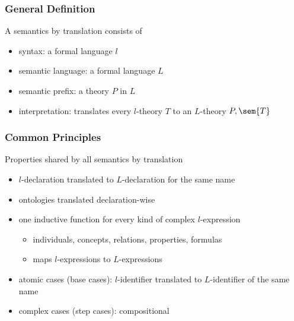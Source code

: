 \begin{frame}\frametitle{General Definition}
A semantics by translation consists of
\begin{itemize}
 \item syntax: a formal language $l$
 \item semantic language: a formal language $L$
 \item semantic prefix: a theory $P$ in $L$
 \item interpretation: translates every $l$-theory $T$ to an $L$-theory $P,\sem{T}$
\end{itemize}
\end{frame}

\begin{frame}\frametitle{Common Principles}
Properties shared by all semantics by translation
\begin{itemize}
 \item $l$-declaration translated to $L$-declaration for the same name
 \item ontologies translated declaration-wise
 \item one inductive function for every kind of complex $l$-expression
  \begin{itemize}
   \item individuals, concepts, relations, properties, formulas
   \item maps $l$-expressions to $L$-expressions
  \end{itemize}
 \item atomic cases (base cases): $l$-identifier translated to $L$-identifier of the same name
 \item complex cases (step cases): compositional
\end{itemize}
\end{frame}

